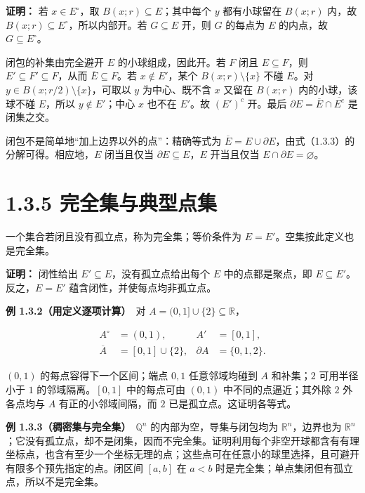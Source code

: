 \documentclass[11pt,a4paper]{article}
\begin{document}
\textbf{证明：} 若 \(x\in E^\circ\)，取 \(B(x;r)\subseteq E\)；其中每个
\(y\) 都有小球留在 \(B(x;r)\) 内，故
\(B(x;r)\subseteq E^\circ\)，所以内部开。若 \(G\subseteq E\) 开，则
\(G\) 的每点为 \(E\) 的内点，故 \(G\subseteq E^\circ\)。

闭包的补集由完全避开 \(E\) 的小球组成，因此开。若 \(F\) 闭且
\(E\subseteq F\)，则 \(E'\subseteq F'\subseteq F\)，从而
\(\overline E\subseteq F\)。若 \(x\notin E'\)，某个
\(B(x;r)\setminus\{x\}\) 不碰 \(E\)。对
\(y\in B(x;r/2)\setminus\{x\}\)，可取以 \(y\) 为中心、既不含 \(x\)
又留在 \(B(x;r)\) 内的小球，该球不碰 \(E\)，所以 \(y\notin E'\)；中心
\(x\) 也不在 \(E'\)。故 \((E')^c\) 开。最后
\(\partial E=\overline E\cap\overline{E^c}\) 是闭集之交。

闭包不是简单地``加上边界以外的点''：精确等式为
\(\overline E=E\cup\partial E\)，由式（1.3.3）的分解可得。相应地，\(E\)
闭当且仅当 \(\partial E\subseteq E\)，\(E\) 开当且仅当
\(E\cap\partial E=\varnothing\)。

\section[\S{}1.3.5
完全集与典型点集]{1.3.5
完全集与典型点集}\label{ux5b8cux5168ux96c6ux4e0eux5178ux578bux70b9ux96c6}

一个集合若闭且没有孤立点，称为完全集；等价条件为
\(E=E'\)。空集按此定义也是完全集。

\textbf{证明：} 闭性给出 \(E'\subseteq E\)，没有孤立点给出每个 \(E\)
中的点都是聚点，即 \(E\subseteq E'\)。反之，\(E=E'\)
蕴含闭性，并使每点均非孤立点。

\textbf{例 1.3.2（用定义逐项计算）}　对
\(A=(0,1]\cup\{2\}\subseteq\mathbb R\)，

\begin{equation*}
\begin{aligned}
A^\circ&=(0,1),& A'&=[0,1],\\
\overline A&=[0,1]\cup\{2\},& \partial A&=\{0,1,2\}.
\end{aligned}\tag{1.3.5}
\end{equation*}

\((0,1)\) 的每点容得下一个区间；端点 \(0,1\) 任意邻域均碰到 \(A\)
和补集；\(2\) 可用半径小于 \(1\) 的邻域隔离。\([0,1]\) 中的每点可由
\((0,1)\) 中不同的点逼近；其外除 \(2\) 外各点均与 \(A\)
有正的小邻域间隔，而 \(2\) 已是孤立点。这证明各等式。

\textbf{例 1.3.3（稠密集与完全集）}　\(\mathbb Q^n\)
的内部为空，导集与闭包均为 \(\mathbb R^n\)，边界也为
\(\mathbb R^n\)；它没有孤立点，却不是闭集，因而不完全集。证明利用每个非空开球都含有有理坐标点，也含有至少一个坐标无理的点；这些点可在任意小的球里选择，且可避开有限多个预先指定的点。闭区间
\([a,b]\) 在 \(a<b\) 时是完全集；单点集闭但有孤立点，所以不是完全集。
\end{document}
